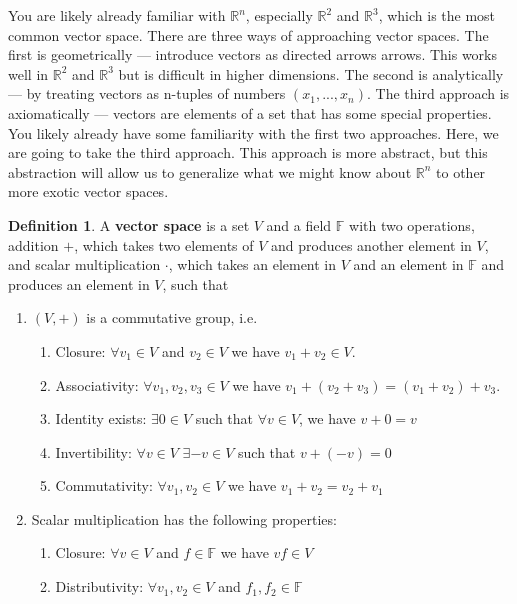 \documentclass[12pt,reqno]{amsart}
\def\F{\mathbb{F}}
\def\R{\mathbb{R}}
\theoremstyle{definition}
\newtheorem{definition}{Definition}[section]
\begin{document}
You are likely already familiar with $\R^n$, especially $\R^2$ and
$\R^3$, which is the most common vector space. There are three ways of
approaching vector spaces. The first is geometrically --- introduce
vectors as directed arrows arrows. This works well in $\R^2$ and
$\R^3$ but is difficult in higher dimensions.  The second is
analytically --- by treating vectors as n-tuples of numbers $(x_1,
..., x_n)$. The third approach is axiomatically --- vectors are
elements of a set that has some special properties. You likely already
have some familiarity with the first two approaches. Here, we are
going to take the third approach. This approach is more abstract, but
this abstraction will allow us to generalize what we might know about
$\R^n$ to other more exotic vector spaces. 

\begin{definition}
  A \textbf{vector space} is a set $V$ and a field $\mathbb{F}$ with
  two operations, addition $+$, which takes two elements of $V$ and
  produces another element in $V$, and scalar multiplication $\cdot$,
  which takes an element in $V$ and an element in $\mathbb{F}$ and
  produces an element in $V$, such that
  \begin{enumerate}
  \item $(V, +)$ is a commutative group, i.e.
    \begin{enumerate}
    \item Closure: $\forall v_1 \in V$ and $v_2 \in V$ we have $v_1
      + v_2 \in V$. 
    \item Associativity: $\forall v_1, v_2, v_3 \in V$ we have $v_1
      + (v_2 + v_3 ) = (v_1 + v_2) + v_3 $. 
    \item Identity exists: $\exists 0 \in V$ such that $\forall v \in
      V$, we have $v + 0 = v$
    \item Invertibility: $\forall v \in V$ $\exists -v \in V$ such
      that $v + (-v) = 0$
    \item Commutativity: $\forall v_1, v_2 \in V$ we have $v_1+v_2 =
      v_2 + v_1$
    \end{enumerate}
  \item Scalar multiplication has the following properties:
    \begin{enumerate}
    \item Closure: $\forall v \in V$ and $f \in \F$ we have $vf \in V$
    \item Distributivity: $\forall v_1 , v_2 \in V$ and $f_1, f_2 \in
      \F$
      \begin{align*}

\end{align*}
\end{enumerate}
\end{enumerate}
\end{definition}
\end{document}
